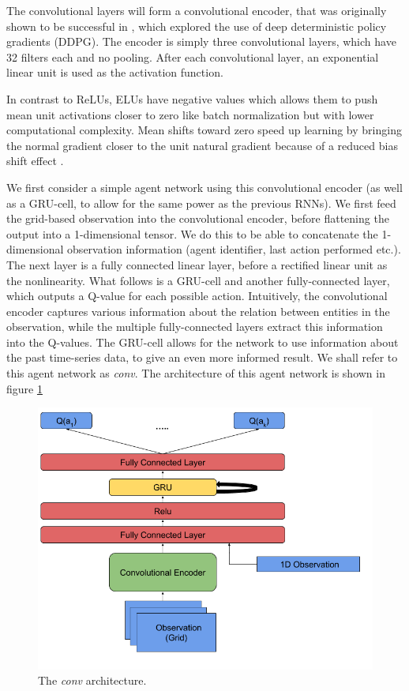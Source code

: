 The convolutional layers will form a convolutional encoder, that was originally shown to be successful in \cite{ddpg}, which explored the use of deep deterministic policy gradients (DDPG). The encoder is simply three convolutional layers, which have 32 filters each and no pooling. After each convolutional layer, an exponential linear unit is used as the activation function.

In contrast to ReLUs, ELUs have negative values which allows them to push mean unit activations closer to zero like batch normalization but with lower computational complexity. Mean shifts toward zero speed up learning by bringing the normal gradient closer to the unit natural gradient because of a reduced bias shift effect \cite{elu}.


We first consider a simple agent network using this convolutional encoder (as well as a GRU-cell, to allow for the same power as the previous RNNs). We first feed the grid-based observation into the convolutional encoder, before flattening the output into a 1-dimensional tensor. We do this to be able to concatenate the 1-dimensional observation information (agent identifier, last action performed etc.). The next layer is a fully connected linear layer, before a rectified linear unit as the nonlinearity. What follows is a GRU-cell and another fully-connected layer, which outputs a Q-value for each possible action. Intuitively, the convolutional encoder captures various information about the relation between entities in the observation, while the multiple fully-connected layers extract this information into the Q-values. The GRU-cell allows for the network to use information about the past time-series data, to give an even more informed result. We shall refer to this agent network as \textit{conv}. The architecture of this agent network is shown in figure \ref{fig:conv_agent_diagram}

\begin{figure}
    \centering
    \includegraphics[scale=0.3]{images/agent_diagrams/rnn_conv_ddpg_agent_diagram.png}
    \caption{The \textit{conv} architecture.}
    \label{fig:conv_agent_diagram}
\end{figure}

